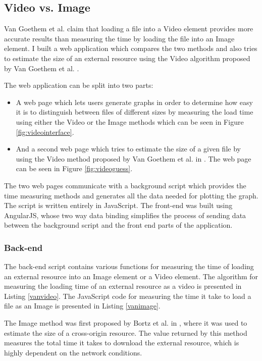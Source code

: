 \documentclass[10pt,a4paper,twoside]{book}
\begin{document}
\subsection{Video vs. Image}
Van Goethem et al. \cite{van2015clock} claim that loading a file into a Video element provides more accurate results than measuring the time by loading the file into an Image element. I built a web application which compares the two methods and also tries to estimate the size of an external resource using the Video algorithm proposed by Van Goethem et al. \cite{van2015clock}.

The web application can be split into two parts:
\begin{itemize}
\item A web page which lets users generate graphs in order to determine how easy it is to distinguish between files of different sizes by measuring the load time using either the Video or the Image methods which can be seen in Figure \ref{fig:videointerface}.
\item And a second web page which tries to estimate the size of a given file by using the Video method proposed by Van Goethem et al. in \cite{van2015clock}. The web page can be seen in Figure \ref{fig:videoguess}.
\end{itemize}

The two web pages communicate with a background script which provides the time measuring methods and generates all the data needed for plotting the graph. The script is written entirely in JavaScript. The front-end was built using AngularJS, whose two way data binding simplifies the process of sending data between the background script and the front end parts of the application.

\subsubsection{Back-end}

The back-end script contains various functions for measuring the time of loading an external resource into an Image element or a Video element. The algorithm for measuring the loading time of an external resource as a video is presented in Listing \ref{vanvideo}. The JavaScript code for measuring the time it take to load a file as an Image is presented in Listing \ref{vanimage}.

The Image method was first proposed by Bortz et al. in \cite{bortz2007exposing}, where it was used to estimate the size of a cross-origin resource. The value returned by this method measures the total time it takes to download the external resource, which is highly dependent on the network conditions. 
\end{document}
